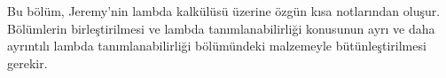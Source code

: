 \documentclass[../../../include/open-logic-chapter]{subfiles}
\begin{document}

\begin{editorial}
Bu bölüm, Jeremy'nin lambda kalkülüsü üzerine özgün kısa notlarından oluşur.
Bölümlerin birleştirilmesi ve lambda tanımlanabilirliği konusunun ayrı ve
daha ayrıntılı lambda tanımlanabilirliği bölümündeki malzemeyle
bütünleştirilmesi gerekir.
\end{editorial}














\OLEndChapterHook
\end{document}
